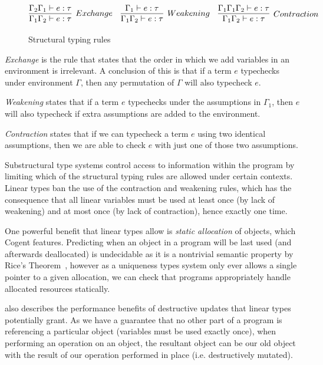 \begin{figure}
    \centering
    $$
        \infer[Exchange]{
            \Gamma_1\Gamma_2 \vdash e : \tau
        }{
            \Gamma_2\Gamma_1 \vdash e : \tau
        }\quad
        \infer[Weakening]{
            \Gamma_1\Gamma_2 \vdash e : \tau
        }{
            \Gamma_1 \vdash e : \tau
        }\quad
        \infer[Contraction]{
            \Gamma_1\Gamma_2 \vdash e : \tau
        }{
            \Gamma_1\Gamma_1\Gamma_2 \vdash e : \tau
        }
    $$
    \caption{Structural typing rules}
    \label{def:structural}
\end{figure}

\textit{Exchange} is the rule that states that the order in which we add variables in an environment
is irrelevant. A conclusion of this is that if a term $e$ typechecks under environment $\Gamma$,
then any permutation of $\Gamma$ will also typecheck $e$.

\textit{Weakening} states that if a term $e$ typechecks under the assumptions
in $\Gamma_1$, then $e$ will also typecheck if extra assumptions are added to the environment.

\textit{Contraction} states that if we can typecheck a term $e$ using two identical
assumptions, then we are able to check $e$ with just one of those two assumptions.

Substructural type systems control access to information within the program by limiting which
of the structural typing rules are allowed under certain contexts. Linear types ban the use of the
contraction and weakening rules, which has the consequence that all linear variables must be used 
at least once (by lack of weakening) and at most once (by lack of contraction), hence exactly one time.

One powerful benefit that linear types allow is \textit{static allocation} of objects, which Cogent
features. Predicting when an object in a program will be last used (and afterwards deallocated)
is undecidable as it is a nontrivial semantic property by Rice's Theorem~\citep{Sipser},
however as a uniqueness types system only ever allows a single pointer to a given allocation, we
can check that programs appropriately handle allocated resources statically.

\citet{LinearTypesChangeTheWorld} also describes the performance benefits of destructive updates
that linear types potentially grant. As we have a guarantee that no other part of a program is
referencing a particular object (variables must be used exactly once), when performing
an operation on an object, the resultant object can be our old object with the result
of our operation performed in place (i.e. destructively mutated).

